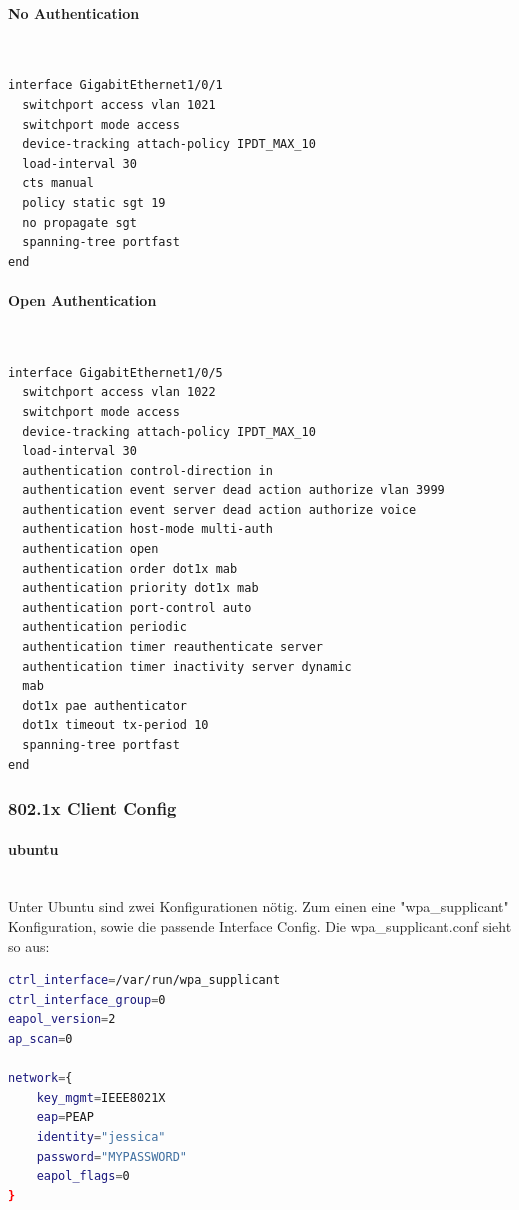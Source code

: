 \paragraph{No Authentication}
~\\
\begin{lstlisting}[language=bash]
interface GigabitEthernet1/0/1
  switchport access vlan 1021
  switchport mode access
  device-tracking attach-policy IPDT_MAX_10
  load-interval 30
  cts manual 
  policy static sgt 19
  no propagate sgt
  spanning-tree portfast
end
\end{lstlisting}
\paragraph{Open Authentication}
~\\
\begin{lstlisting}[language=bash]
interface GigabitEthernet1/0/5
  switchport access vlan 1022
  switchport mode access
  device-tracking attach-policy IPDT_MAX_10
  load-interval 30
  authentication control-direction in
  authentication event server dead action authorize vlan 3999
  authentication event server dead action authorize voice
  authentication host-mode multi-auth
  authentication open
  authentication order dot1x mab
  authentication priority dot1x mab
  authentication port-control auto
  authentication periodic
  authentication timer reauthenticate server
  authentication timer inactivity server dynamic
  mab
  dot1x pae authenticator
  dot1x timeout tx-period 10
  spanning-tree portfast
end
\end{lstlisting}

\subsubsection{802.1x Client Config}

\paragraph{ubuntu}
~\\

Unter Ubuntu sind zwei Konfigurationen nötig. Zum einen eine "wpa\_supplicant" Konfiguration, sowie die passende Interface Config.
Die wpa\_supplicant.conf sieht so aus:

\begin{lstlisting}[language=bash]
ctrl_interface=/var/run/wpa_supplicant
ctrl_interface_group=0
eapol_version=2
ap_scan=0

network={
	key_mgmt=IEEE8021X
	eap=PEAP
	identity="jessica"
	password="MYPASSWORD"
	eapol_flags=0
}
\end{lstlisting}

